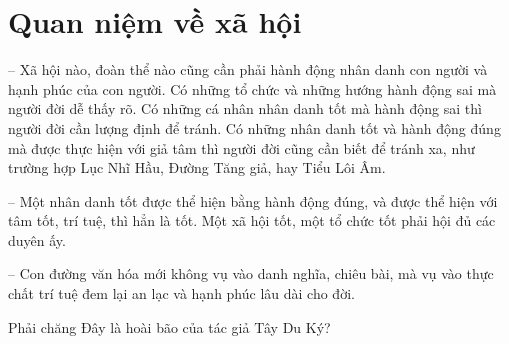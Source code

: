 \section{Quan niệm về xã hội} %
\label{sec:65_66_xa_hoi}

-- Xã hội nào, đoàn thể nào cũng cần phải hành động nhân danh con người và hạnh phúc của con người. Có những tổ chức và những hướng hành động sai mà người đời dễ thấy rõ. Có những cá nhân nhân danh tốt mà hành động sai thì người đời cần lượng định để tránh. Có những nhân danh tốt và hành động đúng mà được thực hiện với giả tâm thì người đời cũng cần biết để tránh xa, như trường hợp Lục Nhĩ Hầu, Đường Tăng giả, hay Tiểu Lôi Âm.

-- Một nhân danh tốt được thể hiện bằng hành động đúng, và được thể hiện với tâm tốt, trí tuệ, thì hẳn là tốt. Một xã hội tốt, một tổ chức tốt phải hội đủ các duyên ấy.

-- Con đường văn hóa mới không vụ vào danh nghĩa, chiêu bài, mà vụ vào thực chất trí tuệ đem lại an lạc và hạnh phúc lâu dài cho đời.

Phải chăng Đây là hoài bão của tác giả Tây Du Ký?
